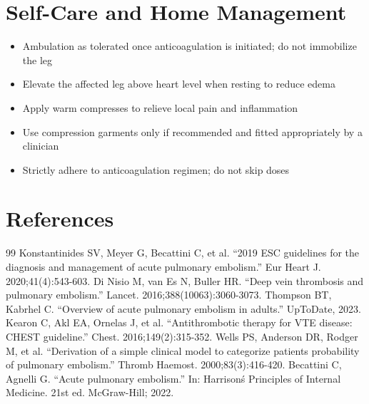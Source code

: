 \section*{Self-Care and Home Management}
\begin{itemize}
  \item Ambulation as tolerated once anticoagulation is initiated; do not immobilize the leg
  \item Elevate the affected leg above heart level when resting to reduce edema
  \item Apply warm compresses to relieve local pain and inflammation
  \item Use compression garments only if recommended and fitted appropriately by a clinician
  \item Strictly adhere to anticoagulation regimen; do not skip doses
\end{itemize}

\section*{References}
\begin{thebibliography}{99}
 Konstantinides SV, Meyer G, Becattini C, et al. ``2019 ESC guidelines for the diagnosis and management of acute pulmonary embolism.'' Eur Heart J. 2020;41(4):543-603.
 Di Nisio M, van Es N, Buller HR. ``Deep vein thrombosis and pulmonary embolism.'' Lancet. 2016;388(10063):3060-3073.
 Thompson BT, Kabrhel C. ``Overview of acute pulmonary embolism in adults.'' UpToDate, 2023.
 Kearon C, Akl EA, Ornelas J, et al. ``Antithrombotic therapy for VTE disease: CHEST guideline.'' Chest. 2016;149(2):315-352.
 Wells PS, Anderson DR, Rodger M, et al. ``Derivation of a simple clinical model to categorize patients probability of pulmonary embolism.'' Thromb Haemost. 2000;83(3):416-420.
 Becattini C, Agnelli G. ``Acute pulmonary embolism.'' In: Harrison\'s Principles of Internal Medicine. 21st ed. McGraw-Hill; 2022.
\end{thebibliography}
